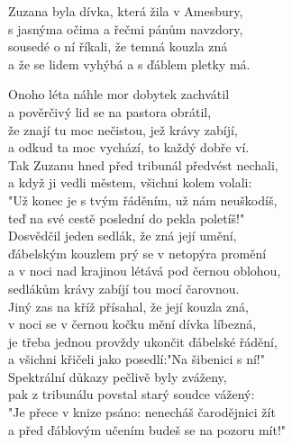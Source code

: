 
Zuzana byla dívka, která žila v Amesbury,\\
s jasnýma očima a řečmi pánům navzdory,\\
sousedé o ní říkali, že temná kouzla zná\\
a že se lidem vyhýbá a s ďáblem pletky má.\\

\begin{large}

Onoho léta náhle mor dobytek zachvátil\\
a pověrčivý lid se na pastora obrátil,\\
že znají tu moc nečistou, jež krávy zabíjí,\\
a odkud ta moc vychází, to každý dobře ví.\\

Tak Zuzanu hned před tribunál předvést nechali,\\
a když ji vedli městem, všichni kolem volali:\\
"Už konec je s tvým řáděním, už nám neuškodíš,\\
teď na své cestě poslední do pekla poletíš!"\\
    
Dosvědčil jeden sedlák, že zná její umění,\\
ďábelským kouzlem prý se v netopýra promění\\
a v noci nad krajinou létává pod černou oblohou,\\
sedlákům krávy zabíjí tou mocí čarovnou.\\
    
Jiný zas na kříž přísahal, že její kouzla zná,\\
v noci se v černou kočku mění dívka líbezná,\\
je třeba jednou provždy ukončit ďábelské řádění,\\
a všichni křičeli jako posedlí:"Na šibenici s ní!"\\
     
Spektrální důkazy pečlivě byly zváženy,\\
pak z tribunálu povstal starý soudce vážený:\\
"Je přece v knize psáno: nenecháš čarodějnici žít\\
a před ďáblovým učením budeš se na pozoru mít!"\\
    

\end{large}

